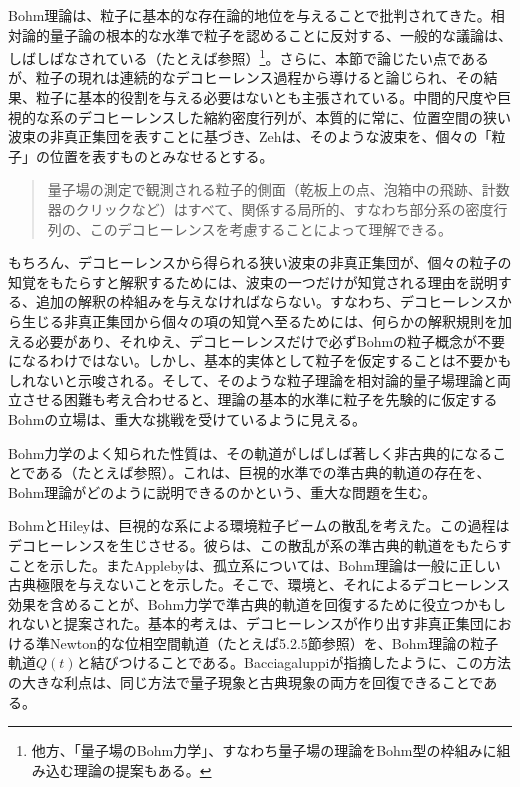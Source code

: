 \hypertarget{srcpage:356}{}\label{srcpage:356}
Bohm理論は、粒子に基本的な存在論的地位を与えることで批判されてきた。相対論的量子論の根本的な水準で粒子を認めることに反対する、一般的な議論は、しばしばなされている（たとえば\cite{ref482,ref483}参照）\footnote{他方、「量子場のBohm力学」、すなわち量子場の理論をBohm型の枠組みに組み込む理論の提案もある\cite{ref484,ref485}。}。さらに、本節で論じたい点であるが、粒子の現れは連続的なデコヒーレンス過程から導けると論じられ、その結果、粒子に基本的役割を与える必要はないとも主張されている\cite{ref408,ref486,ref487}。中間的尺度や巨視的な系のデコヒーレンスした縮約密度行列が、本質的に常に、位置空間の狭い波束の非真正集団を表すことに基づき、Zeh\cite[190頁]{ref408}は、そのような波束を、個々の「粒子」の位置を表すものとみなせるとする。
\begin{quote}
量子場の測定で観測される粒子的側面（乾板上の点、泡箱中の飛跡、計数器のクリックなど）はすべて、関係する局所的、すなわち部分系の密度行列の、このデコヒーレンスを考慮することによって理解できる。
\end{quote}
もちろん、デコヒーレンスから得られる狭い波束の非真正集団が、個々の粒子の知覚をもたらすと解釈するためには、波束の一つだけが知覚される理由を説明する、追加の解釈の枠組みを与えなければならない。すなわち、デコヒーレンスから生じる非真正集団から個々の項の知覚へ至るためには、何らかの解釈規則を加える必要があり、それゆえ、デコヒーレンスだけで必ずBohmの粒子概念が不要になるわけではない。しかし、基本的実体として粒子を仮定することは不要かもしれないと示唆される。そして、そのような粒子理論を相対論的量子場理論と両立させる困難も考え合わせると、理論の基本的水準に粒子を先験的に仮定するBohmの立場は、重大な挑戦を受けているように見える。

Bohm力学のよく知られた性質は、その軌道がしばしば著しく非古典的になることである（たとえば\cite{ref037,ref488,ref489}参照）。これは、巨視的水準での準古典的軌道の存在を、Bohm理論がどのように説明できるのかという、重大な問題を生む。


\hypertarget{srcpage:357}{}\label{srcpage:357}
BohmとHiley\cite{ref037}は、巨視的な系による環境粒子ビームの散乱を考えた。この過程はデコヒーレンスを生じさせる\cite{ref007,ref017}。彼らは、この散乱が系の準古典的軌道をもたらすことを示した。またAppleby\cite{ref489}は、孤立系については、Bohm理論は一般に正しい古典極限を与えないことを示した。そこで、環境と、それによるデコヒーレンス効果を含めることが、Bohm力学で準古典的軌道を回復するために役立つかもしれないと提案された\cite{ref486,ref490,ref491,ref492,ref493,ref494}。基本的考えは、デコヒーレンスが作り出す非真正集団における準Newton的な位相空間軌道（たとえば5.2.5節参照）を、Bohm理論の粒子軌道$Q(t)$と結びつけることである。Bacciagaluppi\cite{ref391}が指摘したように、この方法の大きな利点は、同じ方法で量子現象と古典現象の両方を回復できることである。

